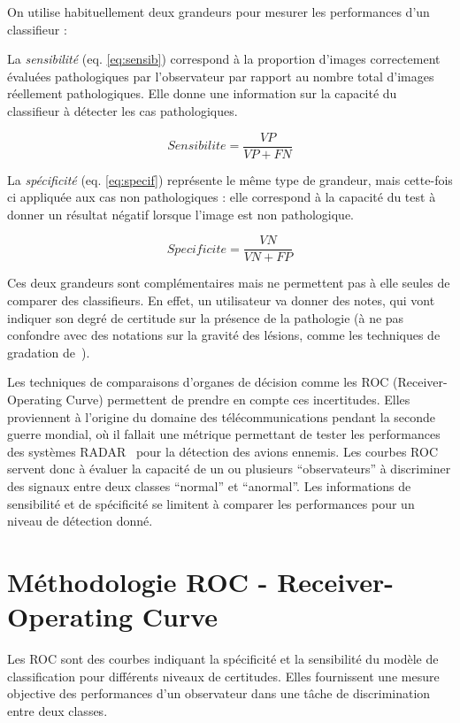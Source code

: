 On utilise habituellement deux grandeurs pour mesurer les performances d'un classifieur :

La \emph{sensibilité} (eq. \ref{eq:sensib}) correspond à la proportion d'images correctement évaluées pathologiques par l'observateur par rapport au nombre total d'images réellement pathologiques. Elle donne une information sur la capacité du classifieur à détecter les cas pathologiques.

\begin{equation}
	\label{eq:sensib}
	Sensibilite = \frac{VP}{VP + FN}
\end{equation}

La \emph{spécificité} (eq. \ref{eq:specif}) représente le même type de grandeur, mais cette-fois ci appliquée aux cas non pathologiques : elle correspond à la capacité du test à donner un résultat négatif lorsque l'image est non pathologique.

\begin{equation}
	\label{eq:specif}
	Specificite = \frac{VN}{VN + FP}
\end{equation}

Ces deux grandeurs sont complémentaires mais ne permettent pas à elle seules de comparer des classifieurs. En effet, un  utilisateur va donner des notes, qui vont indiquer son degré de certitude sur la présence de la pathologie (à ne pas confondre avec des notations sur la gravité des lésions, comme les techniques de gradation de~\cite{genestie1998comparison}).

Les techniques de comparaisons d'organes de décision comme les ROC (Receiver-Operating Curve) permettent de prendre en compte ces incertitudes. Elles proviennent à l'origine du domaine des télécommunications pendant la seconde guerre mondial, où il fallait une métrique permettant de tester les performances des systèmes RADAR~\cite{zou2007receiver} pour la détection des avions ennemis. Les courbes ROC servent donc à évaluer la capacité de un ou plusieurs ``observateurs'' à discriminer des signaux entre deux classes ``normal'' et ``anormal''. Les informations de sensibilité et de spécificité se limitent à comparer les performances pour un niveau de détection donné.

	\section{Méthodologie ROC - Receiver-Operating Curve}

Les ROC \cite{swets1982evaluation}\cite{metz1986roc} sont des courbes indiquant la spécificité et la sensibilité du modèle de classification pour différents niveaux de certitudes. Elles fournissent une mesure objective des performances d'un observateur dans une tâche de discrimination entre deux classes. 

